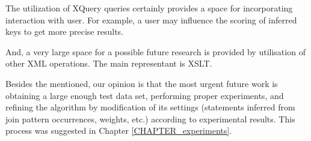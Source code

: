 The utilization of XQuery queries certainly provides a space for incorporating interaction with user. For example, a user may influence the scoring of inferred keys to get more precise results.

And, a very large space for a possible future research is provided by utilisation of other XML operations. The main representant is XSLT.

Besides the mentioned, our opinion is that the most urgent future work is obtaining a large enough test data set, performing proper experiments, and refining the algorithm by modification of its settings (statements inferred from join pattern occurrences, weights, etc.) according to experimental results. This process was suggested in Chapter \ref{CHAPTER_experiments}.